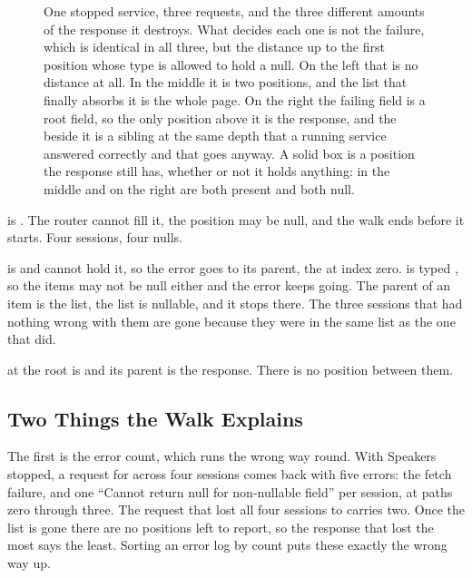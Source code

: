 \begin{figure}[htbp]
  \centering
  
  \caption{One stopped service, three requests, and the three different amounts
  of the response it destroys. What decides each one is not the failure, which
  is identical in all three, but the distance up to the first position whose
  type is allowed to hold a null. On the left that is no distance at all. In
  the middle it is two positions, and the list that finally absorbs it is the
  whole page. On the right the failing field is a root field, so the only
  position above it is the response, and the  beside it is a
  sibling at the same depth that a running service answered correctly and that
  goes anyway. A solid box is a position the response still has, whether or not
  it holds anything:  in the middle and  on the right
  are both present and both null.}
  \label{fig:ch14-the-climb-crosses}
\end{figure}

%
 is . The router cannot fill it, the position may
be null, and the walk ends before it starts. Four sessions, four nulls.

%
 is  and cannot hold it, so the error goes to its
parent, the  at index zero.  is typed
\code{[Session!]}, so the items may not be null either and the error keeps
going. The parent of an item is the list, the list is nullable, and it stops
there. The three sessions that had nothing wrong with them are gone because
they were in the same list as the one that did.

%
 at the root is  and its parent is the response.
There is no position between them.

\subsection{Two Things the Walk Explains}

%
The first is the error count, which runs the wrong way round. With Speakers
stopped, a request for  across four sessions comes back
with five errors: the fetch failure, and one
\enquote{Cannot return null for non-nullable field} per session, at paths zero
through three. The request that lost all four sessions to
 carries two. Once the list is gone there are no positions
left to report, so the response that lost the most says the least. Sorting an
error log by count puts these exactly the wrong way up.

